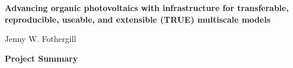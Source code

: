
%
%
%
%
%
%

\begin{center}
    \large{\textbf{Advancing organic photovoltaics with infrastructure for transferable, reproducible, useable, and extensible (TRUE) multiscale models}}
\end{center}
\begin{center}
    Jenny W. Fothergill
\end{center}
\begin{center}
    \textbf{Project Summary}
\end{center}

%

